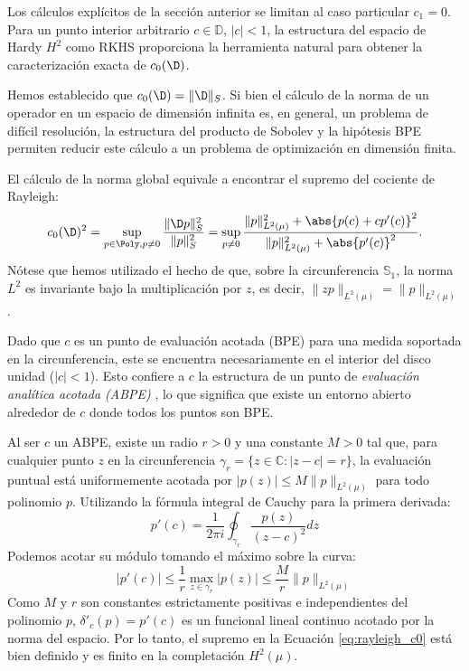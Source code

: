 Los cálculos explícitos de la sección anterior se limitan al caso particular $c_1 = 0$. Para un punto interior arbitrario $c \in \mathbb{D}$, $|c| < 1$, la estructura del espacio de Hardy $H^2$ como RKHS proporciona la herramienta natural para obtener la caracterización exacta de $c_0(\D)$.

Hemos establecido que $c_0(\D) = \|\D\|_S$. Si bien el cálculo de la norma de un operador en un espacio de dimensión infinita es, en general, un problema de difícil resolución, la estructura del producto de Sobolev y la hipótesis BPE permiten reducir este cálculo a un problema de optimización en dimensión finita.

El cálculo de la norma global equivale a encontrar el supremo del cociente de Rayleigh:
\begin{equation} \label{eq:rayleigh_c0}
	c_0(\D)^2 = \sup_{p \in \Poly, p \neq 0} \frac{\|\D p\|_S^2}{\|p\|_S^2} = \sup_{p \neq 0} \frac{\|p\|_{L^2(\mu)}^2 + \abs{p(c) + c p'(c)}^2}{\|p\|_{L^2(\mu)}^2 + \abs{p'(c)}^2}.
\end{equation}
Nótese que hemos utilizado el hecho de que, sobre la circunferencia $\mathbb{S}_1$, la norma $L^2$ es invariante bajo la multiplicación por $z$, es decir, $\|zp\|_{L^2(\mu)} = \|p\|_{L^2(\mu)}$.

Dado que $c$ es un punto de evaluación acotada (BPE) para una medida soportada en la circunferencia, este se encuentra necesariamente en el interior del disco unidad ($|c| < 1$). Esto confiere a $c$ la estructura de un punto de \textit{evaluación analítica acotada (ABPE)} \cite{conway2020approximationmeanrationalfunctions, aleman2009nontangential}, lo que significa que existe un entorno abierto alrededor de $c$ donde todos los puntos son BPE.

Al ser $c$ un ABPE, existe un radio $r > 0$ y una constante $M > 0$ tal que, para cualquier punto $z$ en la circunferencia $\gamma_r = \{z \in \mathbb{C} : |z - c| = r\}$, la evaluación puntual está uniformemente acotada por $|p(z)| \le M \|p\|_{L^2(\mu)}$ para todo polinomio $p$. Utilizando la fórmula integral de Cauchy para la primera derivada:
\begin{equation}
	p'(c) = \frac{1}{2\pi i} \oint_{\gamma_r} \frac{p(z)}{(z-c)^2} dz
\end{equation}
Podemos acotar su módulo tomando el máximo sobre la curva:
\begin{equation}
	|p'(c)| \le \frac{1}{r} \max_{z \in \gamma_r} |p(z)| \le \frac{M}{r} \|p\|_{L^2(\mu)}
\end{equation}
Como $M$ y $r$ son constantes estrictamente positivas e independientes del polinomio $p$, $\delta'_c(p) = p'(c)$ es un funcional lineal continuo acotado por la norma del espacio. Por lo tanto, el supremo en la Ecuación \eqref{eq:rayleigh_c0} está bien definido y es finito en la completación $H^2(\mu)$.

